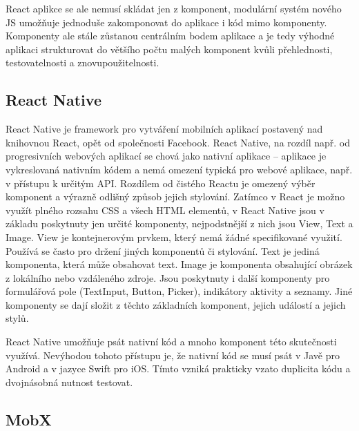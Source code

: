 React aplikce se ale nemusí skládat jen z komponent, modulární systém nového JS umožňuje jednoduše zakomponovat do aplikace i kód mimo komponenty. Komponenty ale stále zůstanou centrálním bodem aplikace a je tedy výhodné aplikaci strukturovat do většího počtu malých komponent kvůli přehlednosti, testovatelnosti a znovupoužitelnosti.

\subsection{React Native}

React Native je framework pro vytváření mobilních aplikací postavený nad knihovnou React, opět od společnosti Facebook. React Native, na rozdíl např. od progresivních webových aplikací se chová jako nativní aplikace -- aplikace je vykreslovaná nativním kódem a nemá omezení typická pro webové aplikace, např. v přístupu k určitým API. Rozdílem od čistého Reactu je omezený výběr komponent a výrazně odlišný způsob jejich stylování. Zatímco v React je možno využít plného rozsahu CSS a všech HTML elementů, v React Native jsou v základu poskytnuty jen určité komponenty, nejpodstnější z nich jsou View, Text a Image. View je kontejnerovým prvkem, který nemá žádné specifikované využití. Používá se často pro držení jiných komponentů či stylování. Text je jediná komponenta, která může obsahovat text. Image je komponenta obsahující obrázek z lokálního nebo vzdáleného zdroje. Jsou poskytnuty i další komponenty pro formulářová pole (TextInput, Button, Picker), indikátory aktivity a seznamy. Jiné komponenty se dají složit z těchto základních komponent, jejich událostí a jejich stylů. 


React Native umožňuje psát nativní kód a mnoho komponent této skutečnosti využívá. Nevýhodou tohoto přístupu je, že nativní kód se musí psát v Javě pro Android a v jazyce Swift pro iOS. Tímto vzniká prakticky vzato duplicita kódu a dvojnásobná nutnost testovat.

\subsection{MobX}


